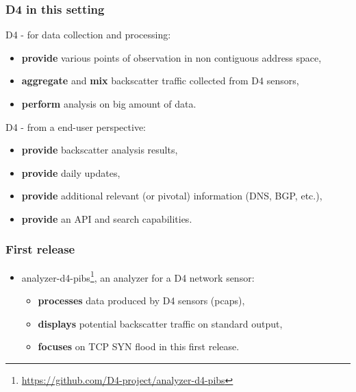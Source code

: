 \documentclass{beamer}
\begin{document}
\begin{frame}
        \frametitle{D4 in this setting}

        
        D4 - for data collection and processing:
        \begin{itemize}
          \item {\bf provide} various points of observation in non contiguous address space,
          \item {\bf aggregate} and {\bf mix} backscatter traffic collected from D4 sensors,
          \item {\bf perform} analysis on big amount of data.
        \end{itemize}

        D4 - from a end-user perspective:
        \begin{itemize}
        \item {\bf provide} backscatter analysis results,
        \item {\bf provide} daily updates,
        \item {\bf provide} additional relevant (or pivotal) information (DNS, BGP, etc.),
        \item {\bf provide} an API and search capabilities.
        \end{itemize}

\end{frame}

\begin{frame}
        \frametitle{First release}

 \begin{itemize}
         \item[\checkmark]
           analyzer-d4-pibs\footnote{\url{https://github.com/D4-project/analyzer-d4-pibs}}, an analyzer for a D4 network sensor:

           \begin{itemize}
           \item {\bf processes} data produced by D4 sensors (pcaps),
           \item {\bf displays} potential backscatter traffic on standard output,
           \item {\bf focuses} on TCP SYN flood in this first release.

\end{itemize}
\end{itemize}
\end{frame}



      
\end{document}
